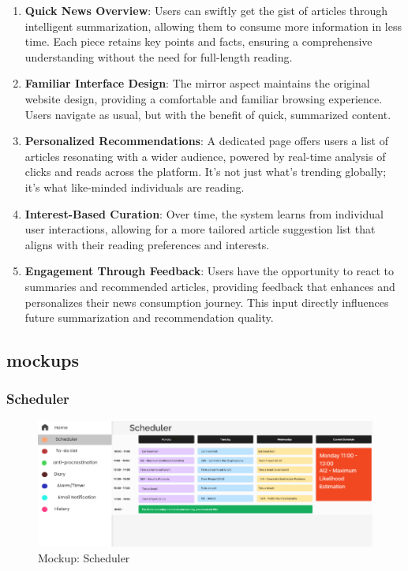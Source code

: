 \documentclass[a4paper]{article}
\begin{document}
\begin{enumerate}[wide, labelwidth=!, labelindent=0pt, label=\textbf{\arabic*.}]
    \item \textbf{Quick News Overview}: 
    Users can swiftly get the gist of articles through intelligent summarization, allowing them to consume more information in less time. Each piece retains key points and facts, ensuring a comprehensive understanding without the need for full-length reading.

    \item \textbf{Familiar Interface Design}: 
    The mirror aspect maintains the original website design, providing a comfortable and familiar browsing experience. Users navigate as usual, but with the benefit of quick, summarized content.

    \item \textbf{Personalized Recommendations}: 
    A dedicated page offers users a list of articles resonating with a wider audience, powered by real-time analysis of clicks and reads across the platform. It’s not just what’s trending globally; it’s what like-minded individuals are reading.

    \item \textbf{Interest-Based Curation}:
    Over time, the system learns from individual user interactions, allowing for a more tailored article suggestion list that aligns with their reading preferences and interests.

    \item \textbf{Engagement Through Feedback}:
    Users have the opportunity to react to summaries and recommended articles, providing feedback that enhances and personalizes their news consumption journey. This input directly influences future summarization and recommendation quality.
\end{enumerate}

\subsection{mockups}

\subsubsection{Scheduler}

\begin{figure}[H] %
	\centering %
	\includegraphics[width=1\textwidth]{./images/Mockup_Scheduler.png} %
	\caption*{Mockup: Scheduler} %
	\label{Fig.Scheduler} %
\end{figure}
\end{document}
